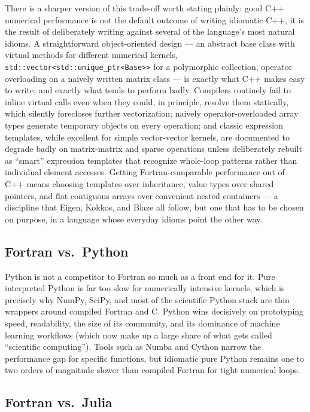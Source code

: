 There is a sharper version of this trade-off worth stating plainly: good C++ numerical performance is not the default outcome of writing idiomatic C++, it is the result of deliberately writing against several of the language's most natural idioms. A straightforward object-oriented design --- an abstract base class with virtual methods for different numerical kernels, \verb|std::vector<std::unique_ptr<Base>>| for a polymorphic collection, operator overloading on a naively written matrix class --- is exactly what C++ makes easy to write, and exactly what tends to perform badly. Compilers routinely fail to inline virtual calls even when they could, in principle, resolve them statically, which silently forecloses further vectorization; naively operator-overloaded array types generate temporary objects on every operation; and classic expression templates, while excellent for simple vector-vector kernels, are documented to degrade badly on matrix-matrix and sparse operations unless deliberately rebuilt as ``smart'' expression templates that recognize whole-loop patterns rather than individual element accesses. Getting Fortran-comparable performance out of C++ means choosing templates over inheritance, value types over shared pointers, and flat contiguous arrays over convenient nested containers --- a discipline that Eigen, Kokkos, and Blaze all follow, but one that has to be chosen on purpose, in a language whose everyday idioms point the other way.

\subsection{Fortran vs.\ Python}

Python is not a competitor to Fortran so much as a front end for it. Pure interpreted Python is far too slow for numerically intensive kernels, which is precisely why NumPy, SciPy, and most of the scientific Python stack are thin wrappers around compiled Fortran and C. Python wins decisively on prototyping speed, readability, the size of its community, and its dominance of machine learning workflows (which now make up a large share of what gets called ``scientific computing''). Tools such as Numba and Cython narrow the performance gap for specific functions, but idiomatic pure Python remains one to two orders of magnitude slower than compiled Fortran for tight numerical loops.

\subsection{Fortran vs.\ Julia}

